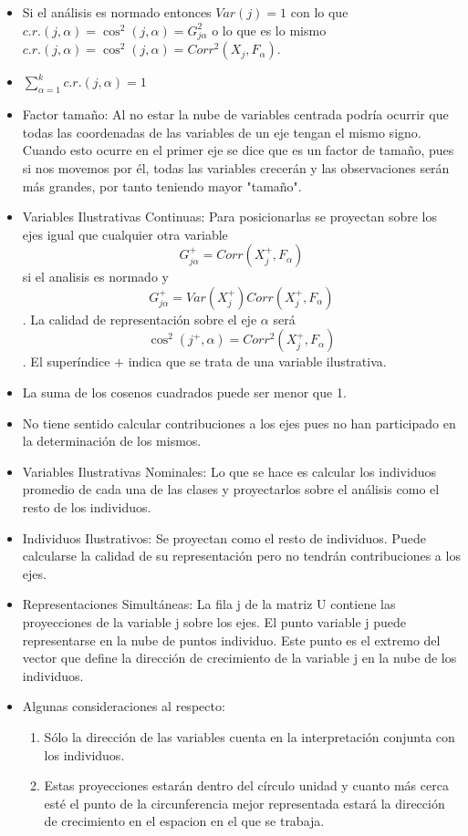 \begin{itemize}
    \item Si el análisis es normado entonces $Var(j)=1$ con lo que $c.r.(j,\alpha)=\cos^2(j,\alpha)=G^2_{j\alpha}$ o lo que es lo mismo $c.r.(j,\alpha)=\cos^2(j,\alpha)=Corr^2(X_j,F_\alpha)$.
    \item $\sum_{\alpha=1}^{k}c.r.(j,\alpha)=1$
    \item Factor tamaño: Al no estar la nube de variables centrada podría ocurrir que todas las coordenadas de las variables de un eje tengan el mismo signo. Cuando esto ocurre en el primer eje se dice que es un factor de tamaño, pues si nos movemos por él, todas las variables crecerán y las observaciones serán más grandes, por tanto teniendo mayor "tamaño".
    \item Variables Ilustrativas Continuas: Para posicionarlas se proyectan sobre los ejes igual que cualquier otra variable \[G^+_{j\alpha}=Corr(X^+_j,F_\alpha)\] si el analisis es normado y \[G^+_{j\alpha}=Var(X^+_j)Corr(X^+_j,F_\alpha)\]. La calidad de representación sobre el eje $\alpha$ será \[\cos^2(j^+,\alpha)=Corr^2(X^+_j,F_\alpha)\]. El superíndice $+$ indica que se trata de una variable ilustrativa.
    \item La suma de los cosenos cuadrados puede ser menor que 1.
    \item No tiene sentido calcular contribuciones a los ejes pues no han participado en la determinación de los mismos.
    \item Variables Ilustrativas Nominales: Lo que se hace es calcular los individuos promedio de cada una de las clases y proyectarlos sobre el análisis como el resto de los individuos.
    \item Individuos Ilustrativos: Se proyectan como el resto de individuos. Puede calcularse la calidad de su representación pero no tendrán contribuciones a los ejes.
    \item Representaciones Simultáneas: La fila j de la matriz U contiene las proyecciones de la variable j sobre los ejes. El punto variable j puede representarse en la nube de puntos individuo. Este punto es el extremo del vector que define la dirección de crecimiento de la variable j en la nube de los individuos.
    \item Algunas consideraciones al respecto:
          \begin{enumerate}
              \item Sólo la dirección de las variables cuenta en la interpretación conjunta con los individuos.
              \item Estas proyecciones estarán dentro del círculo unidad y cuanto más cerca esté el punto de la circunferencia mejor representada estará la dirección de crecimiento en el espacion en el que se trabaja.

\end{enumerate}
\end{itemize}

